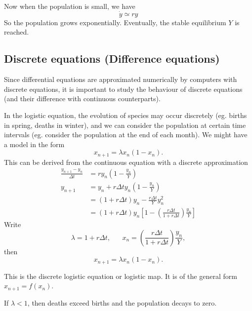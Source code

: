 \documentclass[a4paper]{article}
\begin{document}
  Now when the population is small, we have
  \[
    \dot y \simeq ry
  \]
  So the population grows exponentially. Eventually, the stable equilibrium $Y$ is reached.

  \subsection{Discrete equations (Difference equations)}
  Since differential equations are approximated numerically by computers with discrete equations, it is important to study the behaviour of discrete equations (and their difference with continuous counterparts).

  In the logistic equation, the evolution of species may occur discretely (eg. births in spring, deaths in winter), and we can consider the population at certain time intervals (eg. consider the population at the end of each month). We might have a model in the form
  \[
    x_{n + 1} = \lambda x_n(1 - x_n).
  \]
  This can be derived from the continuous equation with a discrete approximation
  \begin{align*}
    \frac{y_{n+1} - y_n}{\Delta t} &= ry_n\left(1 - \frac{y_n}{Y}\right)\\
    y_{n + 1} &= y_n + r\Delta ty_n\left(1 - \frac{y_n}{Y}\right)\\
    &= (1 + r\Delta t)y_n - \frac{r\Delta t}{Y}y_n^2\\
    &= (1 + r\Delta t)y_n\left[1 - \left(\frac{r\Delta t}{1 + r\Delta t}\right)\frac{y_n}{Y}\right]
  \end{align*}
  Write
  \[
    \lambda = 1 + r\Delta t,\;\;\;\;\;\; x_n = \left(\frac{r\Delta t}{1 + r\Delta t}\right)\frac{y_n}{Y},
  \]
  then
  \[
    x_{n+1}=\lambda x_n(1 - x_n).
  \]

  This is the discrete logistic equation or logistic map. It is of the general form $x_{n + 1} = f(x_n)$.

  If $\lambda  < 1$, then deaths exceed births and the population decays to zero.

  \begin{center}
  \end{center}
\end{document}

